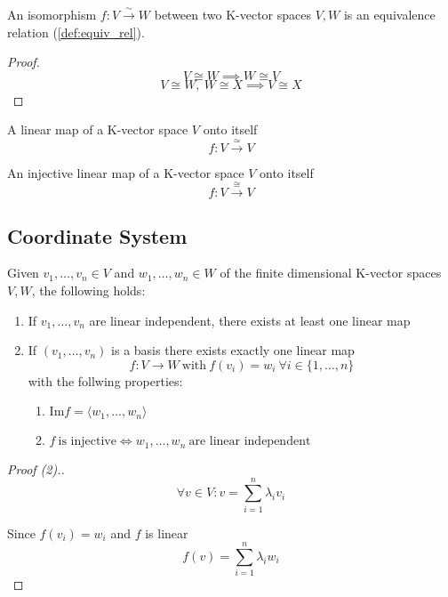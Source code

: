 \begin{theorem}
   An isomorphism \(f: V \xrightarrow{\sim} W\) between two K-vector spaces \(V, W\) is an equivalence relation (\ref{def:equiv_rel}).
\end{theorem}
\begin{proof}
   \[V \cong W \implies W \cong V\]
   \[V \cong W,~W \cong X \implies V \cong X\]
\end{proof}

\begin{definition}[Endomorphism]
   A linear map of a K-vector space \(V\) onto itself
   \[f: V \xrightarrow{\simeq} V\]
\end{definition}

\begin{definition}[Automorphism]
   An injective linear map of a K-vector space \(V\) onto itself
   \[f: V  \xrightarrow{\cong} V\]
\end{definition}

\subsection{Coordinate System}
\begin{theorem}\label{thm:linmap_between_spaces}
   Given \(v_1, \ldots, v_n \in V\) and \(w_1, \ldots, w_n \in W\) of the finite dimensional K-vector spaces \(V, W\), the following holds:

   \begin{enumerate}
      \item If \(v_1, \ldots, v_n\) are linear independent, there exists at least one linear map
      \item If \((v_1, \ldots, v_n)\) is a basis there exists exactly one linear map
      \[f: V \to W~\text{with}~f(v_i) = w_i~\forall i \in \{1, \ldots, n\}\]
      with the follwing properties:
      \begin{enumerate}
         \item \(\text{Im}f = \langle w_1, \ldots, w_n \rangle\)
         \item \(f~\text{is injective} \iff w_1, \ldots, w_n~\text{are linear independent}\)
      \end{enumerate}
   \end{enumerate}
\end{theorem}

\begin{proof}[Proof (2).]
   \[\forall v \in V: v = \sum_{i=1}^n \lambda_i v_i\]

   Since \(f(v_i) = w_i\) and \(f\) is linear
   \[f(v) = \sum_{i=1}^n \lambda_i w_i\]
\end{proof}

